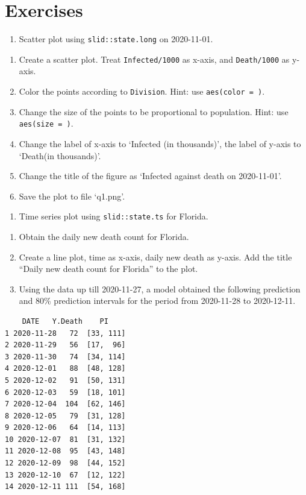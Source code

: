 \documentclass[]{book}
\providecommand{\tightlist}{%
  \setlength{\itemsep}{0pt}\setlength{\parskip}{0pt}}
\begin{document}
\section{Exercises}\label{exercises-1}

\begin{enumerate}
\def\labelenumi{\arabic{enumi}.}
\tightlist
\item
  Scatter plot using \texttt{slid::state.long} on 2020-11-01.
\end{enumerate}

\begin{enumerate}
\def\labelenumi{\alph{enumi}.}
\tightlist
\item
  Create a scatter plot. Treat \texttt{Infected/1000} as x-axis, and
  \texttt{Death/1000} as y-axis.
\item
  Color the points according to \texttt{Division}. Hint: use
  \texttt{aes(color\ =\ )}.
\item
  Change the size of the points to be proportional to population. Hint:
  use \texttt{aes(size\ =\ )}.
\item
  Change the label of x-axis to `Infected (in thousands)', the label of
  y-axis to `Death(in thousands)'.
\item
  Change the title of the figure as `Infected against death on
  2020-11-01'.
\item
  Save the plot to file `q1.png'.
\end{enumerate}

\begin{enumerate}
\def\labelenumi{\arabic{enumi}.}
\setcounter{enumi}{1}
\tightlist
\item
  Time series plot using \texttt{slid::state.ts} for Florida.
\end{enumerate}

\begin{enumerate}
\def\labelenumi{\alph{enumi}.}
\tightlist
\item
  Obtain the daily new death count for Florida.
\item
  Create a line plot, time as x-axis, daily new death as y-axis. Add the
  title ``Daily new death count for Florida'' to the plot.
\item
  Using the data up till 2020-11-27, a model obtained the following
  prediction and 80\% prediction intervals for the period from
  2020-11-28 to 2020-12-11.
\end{enumerate}

\begin{verbatim}
    DATE   Y.Death    PI
1 2020-11-28   72  [33, 111]
2 2020-11-29   56  [17,  96]
3 2020-11-30   74  [34, 114]
4 2020-12-01   88  [48, 128]
5 2020-12-02   91  [50, 131]
6 2020-12-03   59  [18, 101]
7 2020-12-04  104  [62, 146]
8 2020-12-05   79  [31, 128]
9 2020-12-06   64  [14, 113]
10 2020-12-07  81  [31, 132]
11 2020-12-08  95  [43, 148]
12 2020-12-09  98  [44, 152]
13 2020-12-10  67  [12, 122]
14 2020-12-11 111  [54, 168]
\end{verbatim}
\end{document}
